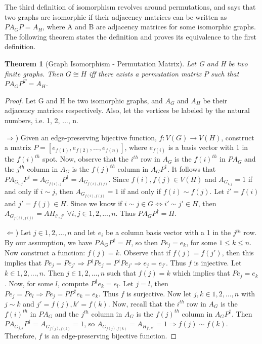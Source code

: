 \documentclass[12pt]{article}
\newtheorem{thm}{Theorem}[section]
\begin{document}
The third definition of isomorphism revolves around permutations, and
says that two graphs are isomorphic if their adjacency matrices can be
written as $PA_GP = A_H$, where A and B are adjacency matrices for
some isomorphic graphs. The following theorem states the definition
and proves its equivalence to the first definition.

\begin{thm}[Graph Isomorphism - Permutation Matrix]
  \label{permutation}
  Let G and H be two finite graphs. Then $G \cong H$ iff there exists
  a permutation matrix $P$ such that $PA_GP^T = A_H$.
\end{thm}

\begin{proof}
Let G and H be two isomorphic graphs, and $A_G$ and $A_H$ be their
adjacency matrices respectively. Also, let the vertices be labeled by
the natural numbers, i.e. 1, 2, ..., n.

$\Rightarrow$) Given an edge-preserving bijective function, $f:V(G)
\to V(H)$, construct a matrix $P = [e_{f(1)}, e_{f(2)}, ...,
  e_{f(n)}]$, where $e_{f(i)}$ is a basis vector with 1 in the
$f(i)^{th}$ spot. Now, observe that the $i^{th}$ row in $A_G$ is the
$f(i)^{th}$ in $PA_G$ and the $j^{th}$ column in $A_G$ is the
$f(j)^{th}$ column in $A_GP^{\dag}$. It follows that $PA_{G_{i,
    j}}P^{\dag} = A_{G_{f(i), j}}P^{\dag} = A_{G_{f(i), f(j)}}$. Since
$f(i), f(j) \in V(H)$ and $A_{G_{i, j}} = 1$ if and only if $i \sim
j$, then $A_{G_{f(i), f(j)}} = 1$ if and only if $f(i) \sim f(j)$. Let
$i' = f(i)$ and $j' = f(j) \in H$. Since we know if $i \sim j \in G
\Leftrightarrow i' \sim j' \in H$, then $A_{G_{f(i), f(j)}} = A{H_{i',
    j'}}$ $\forall i, j \in 1, 2, ..., n$. Thus $PA_GP^{\dag} = H$.

$\Leftarrow$) Let $j \in 1, 2, ..., n$ and let $e_i$ be a column basis
vector with a 1 in the $j^{th}$ row. By our assumption, we have
$PA_GP^{\dag} = H$, so then $Pe_j = e_k$, for some $1 \leq k \leq
n$. Now construct a function: $f(j) = k$. Observe that if $f(j) =
f(j')$, then this implies that $Pe_j = Pe_{j'} \Rightarrow
P^{\dag}Pe_j = P^{\dag}Pe_{j'} \Rightarrow e_j = e_{j'}$. Thus $f$ is
injective. Let $k \in 1, 2, ..., n$. Then $j \in 1, 2, ..., n$ such
that $f(j) = k$ which implies that $Pe_j = e_k$. Now, for some $l$,
compute $P^{\dag}e_k = e_l$. Let $j = l$, then $Pe_j = Pe_l
\Rightarrow Pe_j = PP^{\dag}e_k = e_k$. Thus $f$ is surjective. Now
let $j, k \in 1, 2, ..., n$ with $j \sim k$ and $j' = f(j), k' =
f(k)$. Now, recall that the $i^{th}$ row in $A_G$ is the $f(i)^{th}$
in $PA_G$ and the $j^{th}$ column in $A_G$ is the $f(j)^{th}$ column
in $A_GP^{\dag}$. Then $PA_{G_{j, k}}P^{\dag} = A_{G_{f(j), f(k)}} =
1$, so $A_{G_{f(j), f(k)}} = A_{H_{j', k'}} = 1 \Rightarrow f(j) \sim
f(k)$. Therefore, $f$ is an edge-preserving bijective function.
\end{proof}
\end{document}
